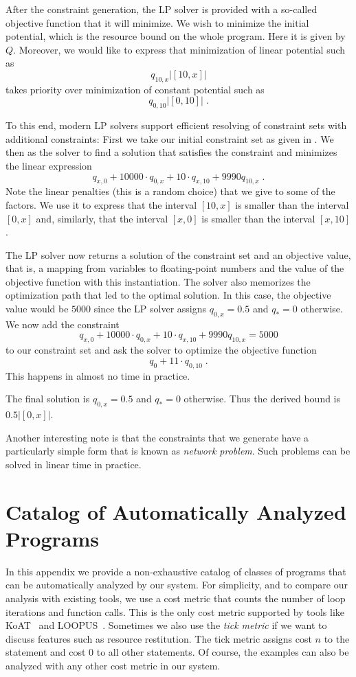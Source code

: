 \documentclass[nocopyrightspace,preprint,pldi]{sigplanconf-pldi15}
\newcommand{\pref}[1]{\prettyref{#1}}
\begin{document}
{After the constraint generation, the LP solver is provided with a
so-called objective function that it will minimize.  We wish to
minimize the initial potential, which is the resource bound on the
whole program.  Here it is given by $Q$.  Moreover, we would like to
express that minimization of linear potential such as
$$
q_{10,x} |[10,x]|
$$
takes priority over minimization of constant potential such as
$$
q_{0,10} |[0,10]| \; .
$$

To this end, modern LP solvers support efficient resolving of
constraint sets with additional constraints: First we take our initial
constraint set as given in \pref{fig:derivation}.  We then as the
solver to find a solution that satisfies the constraint and minimizes
the linear expression
$$
q_{x,0} + 10000{\cdot}q_{0,x} + 10{\cdot}q_{x,10} + 9990q_{10,x} \; .
$$
Note the linear penalties (this is a random choice) that we give to
some of the factors.  We use it to express that the interval $[10,x]$
is smaller than the interval $[0,x]$ and, similarly, that the interval
$[x,0]$ is smaller than the interval $[x,10]$.

The LP solver now returns a solution of the constraint set and an
objective value, that is, a mapping from variables to floating-point
numbers and the value of the objective function with this
instantiation.  The solver also memorizes the optimization path that
led to the optimal solution.  In this case, the objective value would
be
$
5000
$
since the LP solver assigns $q_{0,x} = 0.5$ and $q_{*} = 0$ otherwise.
We now add the constraint
$$
q_{x,0} + 10000{\cdot}q_{0,x} + 10{\cdot}q_{x,10} + 9990q_{10,x} = 5000
$$
to our constraint set and ask the solver to optimize the objective
function
$$
q_0 + 11{\cdot}q_{0,10} \; .
$$
This happens in almost no time in practice.

The final solution is $q_{0,x} = 0.5$ and $q_{*} = 0$ otherwise.  Thus
the derived bound is $0.5 |[0,x]|$.

Another interesting note is that the constraints that we generate have
a particularly simple form that is known as \emph{network problem}.
Such problems can be solved in linear time in practice.

\newpage

\section{Catalog of Automatically Analyzed Programs}
\label{app:cat}

In this appendix we provide a non-exhaustive catalog of classes of
programs that can be automatically analyzed by our system.  For
simplicity, and to compare our analysis with existing tools, we use a
cost metric that counts the number of loop iterations and function
calls.  This is the only cost metric supported by tools like
KoAT~\cite{BrockschmidtEFFG14} and LOOPUS~\cite{SinnZV14}.  Sometimes
we also use the \emph{tick metric} if we want to discuss features such as
resource restitution.  The tick metric assigns cost $n$ to the
statement  and cost $0$ to all other statements. Of
course, the examples can also be analyzed with any other cost metric
in our system.

}
\end{document}
